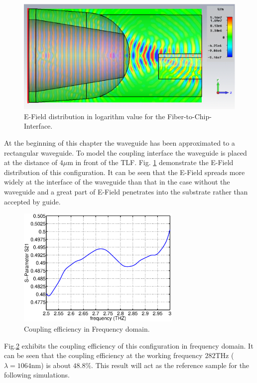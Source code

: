 \begin{figure}[!ht]
\centering
	\includegraphics[width=0.7 \textwidth]{bilder/cst_basic_waveguide_efield}
	\caption{E-Field distribution in logarithm value for the Fiber-to-Chip-Interface.}	
	\label{fig:coupling_e_field}
\end{figure}
At the beginning of this chapter the waveguide has been approximated to a rectangular waveguide. To model the coupling interface the waveguide is placed at the distance of $4\mu$m in front of the TLF.  Fig. \ref{fig:coupling_e_field} demonstrate the E-Field distribution of this configuration. It can be seen that the E-Field spreads more widely at the interface of the waveguide than that in the case without the waveguide and a great part of E-Field penetrates into the substrate rather than accepted by guide.\\
 
\begin{figure}[!ht]
\centering
\includegraphics[width=0.7\textwidth]{bilder/original_coupling_efficiency}
\caption{Coupling efficiency in Frequency domain.}
\label{fig:orignial_coupling_efficiency}
\end{figure}
Fig.\ref{fig:orignial_coupling_efficiency} exhibits the coupling efficiency of this configuration in frequency domain. It can be seen that the coupling efficiency at the working frequency $282$THz ($\lambda=1064$nm) is about $48.8\%$. This result will act as the reference sample for the following simulations.\\ 

